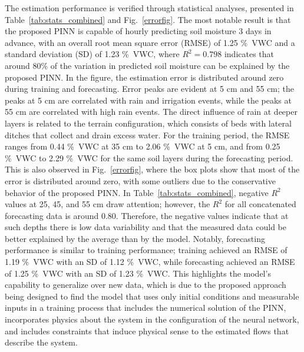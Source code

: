 \documentclass[pdflatex,sn-nature]{sn-jnl}%
\theoremstyle{thmstyleone}%
\theoremstyle{thmstyletwo}%
\theoremstyle{thmstylethree}%
\begin{document}
The estimation performance is verified through statistical analyses, presented in Table~\ref{tab:stats_combined} and Fig.~\ref{errorfig}. The most notable result is that the proposed PINN is capable of hourly predicting soil moisture 3 days in advance, with an overall root mean square error (RMSE) of 1.25 \si{\%VWC} and a standard deviation (SD) of 1.23 \si{\%VWC}, where $R^2=0.798$ indicates that around 80\% of the variation in predicted soil moisture can be explained by the proposed PINN.
In the figure, the estimation error is distributed around zero during training and forecasting. Error peaks are evident at 5 \si{cm} and 55 \si{cm}; the peaks at 5 \si{cm} are correlated with rain and irrigation events, while the peaks at 55 \si{cm} are correlated with high rain events. The direct influence of rain at deeper layers is related to the terrain configuration, which consists of beds with lateral ditches that collect and drain excess water.
For the training period, the RMSE ranges from 0.44 \si{\%VWC} at 35 \si{cm} to 2.06 \si{\%VWC} at 5 \si{cm}, and from 0.25 \si{\%VWC} to 2.29 \si{\%VWC} for the same soil layers during the forecasting period. This is also observed in Fig.~\ref{errorfig}, where the box plots show that most of the error is distributed around zero, with some outliers due to the conservative behavior of the proposed PINN.
In Table~\ref{tab:stats_combined}, negative $R^2$ values at 25, 45, and 55 \si{cm} draw attention; however, the $R^2$ for all concatenated forecasting data is around 0.80. Therefore, the negative values indicate that at such depths there is low data variability and that the measured data could be better explained by the average than by the model. Notably, forecasting performance is similar to training performance; training achieved an RMSE of 1.19 \si{\%VWC} with an SD of 1.12 \si{\%VWC}, while forecasting achieved an RMSE of 1.25 \si{\%VWC} with an SD of 1.23 \si{\%VWC}. This highlights the model's capability to generalize over new data, which is due to the proposed approach being designed to find the model that uses only initial conditions and measurable inputs in a training process that includes the numerical solution of the PINN, incorporates physics about the system in the configuration of the neural network, and includes constraints that induce physical sense to the estimated flows that describe the system.
\end{document}
